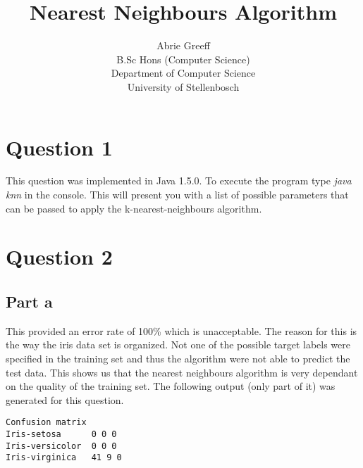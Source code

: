 \documentclass[a4paper,11pt,titlepage]{article}
\author{Abrie Greeff\\B.Sc Hons (Computer Science)\\Department of Computer Science\\University of Stellenbosch}
\title{Nearest Neighbours Algorithm}
\begin{document}
\maketitle
\tableofcontents

\section{Question 1}
This question was implemented in Java 1.5.0. To execute the program type \emph{java knn} in the console. This will present you with a list of possible parameters that can be passed to apply the k-nearest-neighbours algorithm.

\section{Question 2}
\subsection{Part a}
This provided an error rate of 100\% which is unacceptable. The reason for this is the way the iris data set is organized. Not one of the possible target labels were specified in the training set and thus the algorithm were not able to predict the test data. This shows us that the nearest neighbours algorithm is very dependant on the quality of the training set. The following output (only part of it) was generated for this question.
\begin{verbatim}
Confusion matrix
Iris-setosa      0 0 0
Iris-versicolor  0 0 0
Iris-virginica   41 9 0

\end{verbatim}
\end{document}
